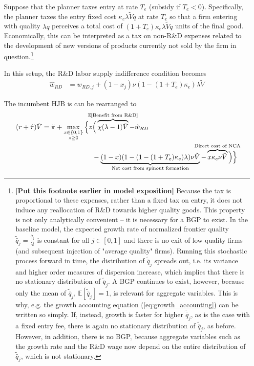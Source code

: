 \documentclass[11pt,english]{article}
\begin{document}
Suppose that the planner taxes entry at rate $T_e$ (subsidy if $T_e < 0$). Specifically, the planner taxes the entry fixed cost $\kappa_e \lambda \tilde{V} q$ at rate $T_e$ so that a firm entering with quality $\lambda q$ perceives a total cost of $(1+T_e) \kappa_e \lambda \tilde{V}q$ units of the final good. Economically, this can be interpreted as a tax on non-R\&D expenses related to the development of new versions of products currently not sold by the firm in question.\footnote{\textbf{[Put this footnote earlier in model exposition]} Because the tax is proportional to these expenses, rather than a fixed tax on entry, it does not induce any reallocation of R\&D towards higher quality goods. This property is not only analytically convenient -- it is necessary for a BGP to exist. In the baseline model, the expected growth rate of normalized frontier quality $\tilde{\bar{q}}_j = \frac{\bar{q}_j}{Q}$ is constant for all $j \in [0,1]$ and there is no exit of low quality firms (and subsequent injection of "average quality" firms). Running this stochastic process forward in time, the distribution of $\tilde{\bar{q}}_j$ spreads out, i.e. its variance and higher order measures of dispersion increase, which implies that there is no stationary distribution of $\tilde{\bar{q}}_j$. A BGP continues to exist, however, because only the mean of $\tilde{\bar{q}}_j$, $\mathbb{E}[\tilde{\bar{q}}_j] = 1$, is relevant for aggregate variables. This is why, e.g. the growth accounting equation (\ref{eq:growth_accounting}) can be written so simply. If, instead, growth is faster for higher $\tilde{\bar{q}}_j$, as is the case with a fixed entry fee, there is again no stationary distribution of $\tilde{\bar{q}}_j$, as before. However, in addition, there is no BGP, because aggregate variables such as the growth rate and the R\&D wage now depend on the entire distribution of $\tilde{\bar{q}}_j$, which is not stationary.}

In this setup, the R\&D labor supply indifference condition becomes
\begin{align}
\hat{w}_{RD} &= w_{RD,j} + (1-x_j) \nu (1-(1+T_e)\kappa_e) \lambda \tilde{V} \label{eq:RD_worker_indifference_entryTax}
\end{align}

The incumbent HJB is can be rearranged to
\begin{align}
(r + \hat{\tau}) \tilde{V} = \tilde{\pi} + \max_{\substack{x \in \{0,1\} \\ z \ge 0}} \Big\{z &\Big( \overbrace{\chi (\lambda - 1) \tilde{V}}^{\mathclap{\mathbb{E}[\textrm{Benefit from R\&D}]}}- \hat{w}_{RD} \\
&-  \underbrace{(1-x)(1 - (1-(1+T_e)\kappa_{e})\lambda)\nu \tilde{V}}_{\mathclap{\text{Net cost from spinout formation}}} - \overbrace{x \kappa_{c} \nu \tilde{V}}^{\mathclap{\text{Direct cost of NCA}}}\Big) \Big\} \label{eq:hjb_incumbent_entryTax_2}
\end{align}
\end{document}
